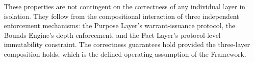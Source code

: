 These properties are not contingent on the correctness of any individual layer in isolation. They follow from the compositional interaction of three independent enforcement mechanisms: the Purpose Layer's warrant-issuance protocol, the Bounds Engine's depth enforcement, and the Fact Layer's protocol-level immutability constraint. The correctness guarantees hold provided the three-layer composition holds, which is the defined operating assumption of the \bxthree{} Framework.

